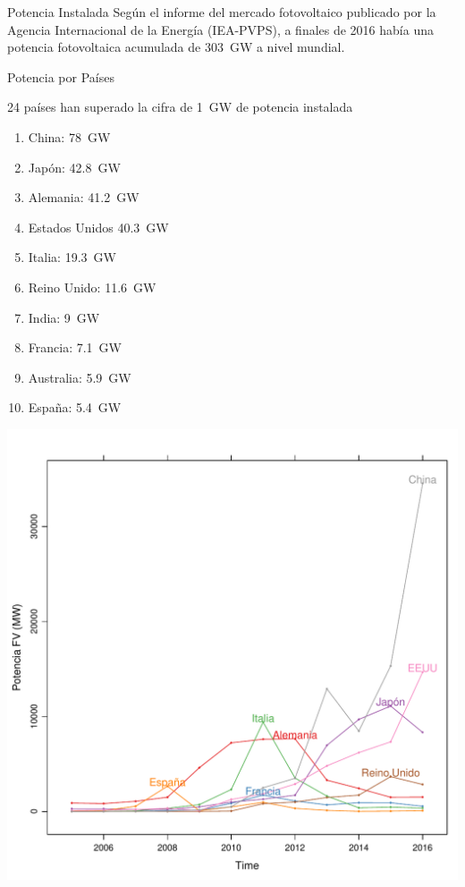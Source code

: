 \documentclass[xcolor={usenames,svgnames,dvipsnames}]{beamer}
\begin{document}
\begin{frame}[label={sec:orgfe7fbc4}]{Potencia Instalada}
Según el informe del mercado fotovoltaico publicado por la Agencia
Internacional de la Energía (IEA-PVPS), a finales de 2016 había una
potencia fotovoltaica acumulada de \SI{303}{\giga\watt} a nivel
mundial.
\end{frame}

\begin{frame}[label={sec:orgfdeaafc}]{Potencia por Países}
\begin{block}{24 países han superado la cifra de \SI{1}{\giga\watt} de potencia instalada}
\begin{enumerate}
\item China: \SI{78}{\giga\watt}
\item Japón: \SI{42.8}{\giga\watt}
\item Alemania: \SI{41.2}{\giga\watt}
\item Estados Unidos \SI{40.3}{\giga\watt}
\item Italia: \SI{19.3}{\giga\watt}
\item Reino Unido: \SI{11.6}{\giga\watt}
\item India: \SI{9}{\giga\watt}
\item Francia: \SI{7.1}{\giga\watt}
\item Australia: \SI{5.9}{\giga\watt}
\item España: \SI{5.4}{\giga\watt}
\end{enumerate}
\end{block}
\end{frame}

\begin{frame}[label={sec:org908c9e8}]{}
\begin{center}
\includegraphics[width=.9\linewidth]{../figs/PVWorld.pdf}
\end{center}
\end{frame}
\end{document}
